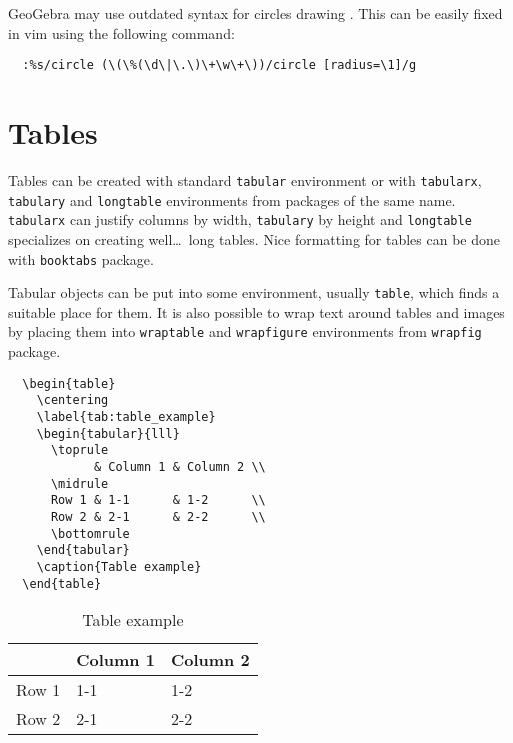 GeoGebra may use outdated syntax for circles drawing \autocite{Aalberto-2020}.
This can be easily fixed in vim using the following command:
\begin{verbatim}
  :%s/circle (\(\%(\d\|\.\)\+\w\+\))/circle [radius=\1]/g
\end{verbatim}

\section{Tables}
Tables can be created with standard \texttt{tabular} environment or with \texttt{tabularx}, \texttt{tabulary} and \texttt{longtable} environments from packages of the same name.
\texttt{tabularx} can justify columns by width, \texttt{tabulary} by height and \texttt{longtable} specializes on creating well\dots\ long tables.
Nice formatting for tables can be done with \texttt{booktabs} package.

Tabular objects can be put into some environment, usually \texttt{table}, which finds a suitable place for them.
It is also possible to wrap text around tables and images by placing them into \texttt{wraptable} and \texttt{wrapfigure} environments from \texttt{wrapfig} package.

\begin{verbatim}
  \begin{table}
    \centering
    \label{tab:table_example}
    \begin{tabular}{lll}
      \toprule
            & Column 1 & Column 2 \\
      \midrule
      Row 1 & 1-1      & 1-2      \\
      Row 2 & 2-1      & 2-2      \\
      \bottomrule
    \end{tabular}
    \caption{Table example}
  \end{table}
\end{verbatim}

\begin{table}[h!]
  \centering
  \label{tab:table_example}
  \begin{tabular}{lll}
    \toprule
          & Column 1 & Column 2 \\
    \midrule
    Row 1 & 1-1      & 1-2      \\
    Row 2 & 2-1      & 2-2      \\
    \bottomrule
  \end{tabular}
  \caption{Table example}
\end{table}

